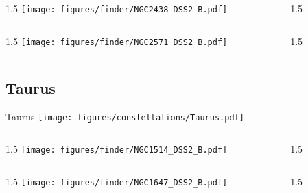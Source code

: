\documentclass[final]{beamer}
\newlength{\colwidth}
\begin{document}

\begin{frame}[t]{}
  \begin{columns}[T]
    \begin{column}{1.5\colwidth}
      \centering
      \texttt{[image: figures/finder/NGC2438\_DSS2\_B.pdf]}
    \end{column}
    \begin{column}{1.5\colwidth}
      \Large
      
    \end{column}
  \end{columns}
  \vspace{\fill}
  \begin{columns}[T]
    \begin{column}{1.5\colwidth}
      \centering
      \texttt{[image: figures/finder/NGC2571\_DSS2\_B.pdf]}
    \end{column}
    \begin{column}{1.5\colwidth}
      \Large
      
    \end{column}
  \end{columns}
\end{frame}

\subsection{Taurus}

\begin{frame}[t]{\LARGE Taurus}
  \centering
  \texttt{[image: figures/constellations/Taurus.pdf]}
\end{frame}


\begin{frame}[t]{}
  \begin{columns}[T]
    \begin{column}{1.5\colwidth}
      \centering
      \texttt{[image: figures/finder/NGC1514\_DSS2\_B.pdf]}
    \end{column}
    \begin{column}{1.5\colwidth}
      \Large
      
    \end{column}
  \end{columns}
  \vspace{\fill}
  \begin{columns}[T]
    \begin{column}{1.5\colwidth}
      \centering
      \texttt{[image: figures/finder/NGC1647\_DSS2\_B.pdf]}
    \end{column}
    \begin{column}{1.5\colwidth}
      \Large
      
    \end{column}
  \end{columns}
\end{frame}
\end{document}
